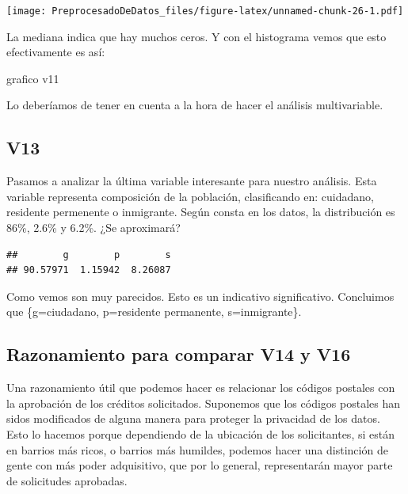 \documentclass[
]{article}
\newenvironment{Shaded}{\begin{snugshade}}{\end{snugshade}}
\newcommand{\DecValTok}[1]{\textcolor[rgb]{0.00,0.00,0.81}{#1}}
\newcommand{\FunctionTok}[1]{\textcolor[rgb]{0.13,0.29,0.53}{\textbf{#1}}}
\newcommand{\NormalTok}[1]{#1}
\newcommand{\SpecialCharTok}[1]{\textcolor[rgb]{0.81,0.36,0.00}{\textbf{#1}}}
\begin{document}
\texttt{[image: PreprocesadoDeDatos\_files/figure-latex/unnamed-chunk-26-1.pdf]}

La mediana indica que hay muchos ceros. Y con el histograma vemos que
esto efectivamente es así:

grafico v11

Lo deberíamos de tener en cuenta a la hora de hacer el análisis
multivariable.

\hypertarget{v13}{%
\subsection{V13}\label{v13}}

Pasamos a analizar la última variable interesante para nuestro análisis.
Esta variable representa composición de la población, clasificando en:
cuidadano, residente permenente o inmigrante. Según consta en los datos,
la distribución es 86\%, 2.6\% y 6.2\%. ¿Se aproximará?

\begin{Shaded}
\end{Shaded}

\begin{verbatim}
##        g        p        s 
## 90.57971  1.15942  8.26087
\end{verbatim}

Como vemos son muy parecidos. Esto es un indicativo significativo.
Concluimos que \{g=ciudadano, p=residente permanente, s=inmigrante\}.

\hypertarget{razonamiento-para-comparar-v14-y-v16}{%
\subsection{Razonamiento para comparar V14 y
V16}\label{razonamiento-para-comparar-v14-y-v16}}

Una razonamiento útil que podemos hacer es relacionar los códigos
postales con la aprobación de los créditos solicitados. Suponemos que
los códigos postales han sidos modificados de alguna manera para
proteger la privacidad de los datos. Esto lo hacemos porque dependiendo
de la ubicación de los solicitantes, si están en barrios más ricos, o
barrios más humildes, podemos hacer una distinción de gente con más
poder adquisitivo, que por lo general, representarán mayor parte de
solicitudes aprobadas.
\end{document}
